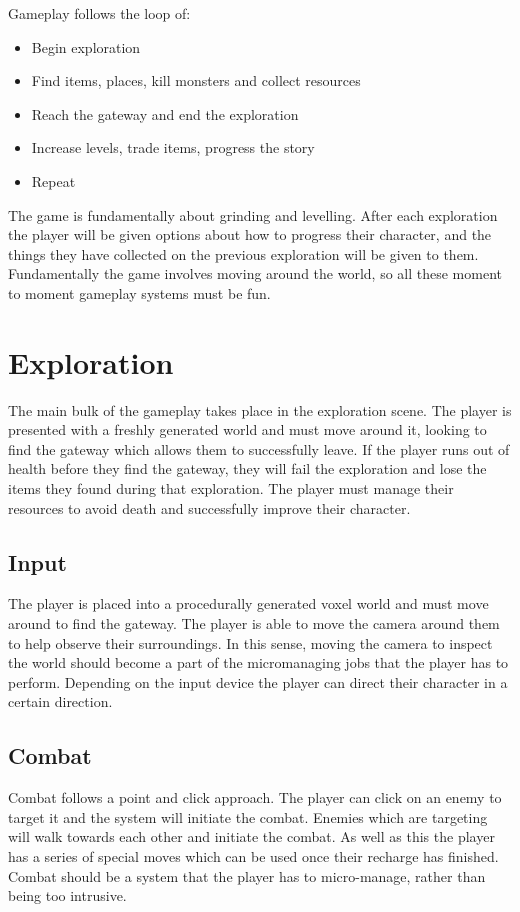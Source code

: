 \documentclass[a4paper]{scrreprt}
\begin{document}
Gameplay follows the loop of:

    \begin{itemize}
        \item Begin exploration
        \item Find items, places, kill monsters and collect resources
        \item Reach the gateway and end the exploration
        \item Increase levels, trade items, progress the story
        \item Repeat
    \end{itemize}

The game is fundamentally about grinding and levelling.
After each exploration the player will be given options about how to progress their character, and the things they have collected on the previous exploration will be given to them.
Fundamentally the game involves moving around the world, so all these moment to moment gameplay systems must be fun.

\section{Exploration}
The main bulk of the gameplay takes place in the exploration scene.
The player is presented with a freshly generated world and must move around it, looking to find the gateway which allows them to successfully leave.
If the player runs out of health before they find the gateway, they will fail the exploration and lose the items they found during that exploration.
The player must manage their resources to avoid death and successfully improve their character.

\subsection{Input}
The player is placed into a procedurally generated voxel world and must move around to find the gateway.
The player is able to move the camera around them to help observe their surroundings.
In this sense, moving the camera to inspect the world should become a part of the micromanaging jobs that the player has to perform.
Depending on the input device the player can direct their character in a certain direction.

\subsection{Combat}
Combat follows a point and click approach.
The player can click on an enemy to target it and the system will initiate the combat.
Enemies which are targeting will walk towards each other and initiate the combat.
As well as this the player has a series of special moves which can be used once their recharge has finished.
Combat should be a system that the player has to micro-manage, rather than being too intrusive.
\end{document}
